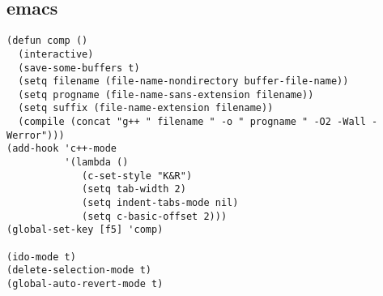 \documentclass[twoside]{article}
\begin{document}
\subsection{emacs}
\begin{lstlisting}
(defun comp ()
  (interactive)
  (save-some-buffers t)
  (setq filename (file-name-nondirectory buffer-file-name))
  (setq progname (file-name-sans-extension filename))
  (setq suffix (file-name-extension filename))
  (compile (concat "g++ " filename " -o " progname " -O2 -Wall -Werror")))
(add-hook 'c++-mode
          '(lambda ()
             (c-set-style "K&R")
             (setq tab-width 2)
             (setq indent-tabs-mode nil)
             (setq c-basic-offset 2)))
(global-set-key [f5] 'comp)

(ido-mode t)
(delete-selection-mode t)
(global-auto-revert-mode t)

\end{lstlisting}
\end{document}
